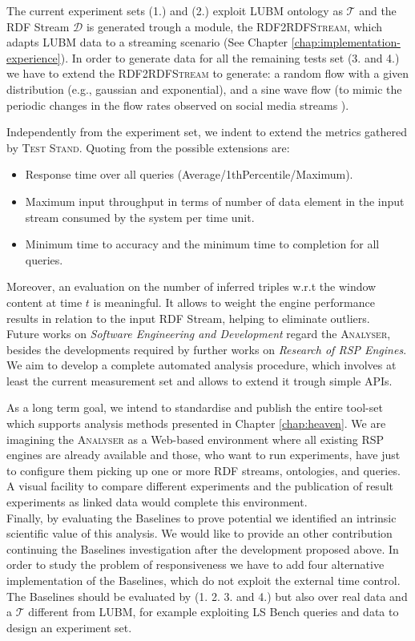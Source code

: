 The current experiment sets (1.) and (2.) exploit LUBM ontology as $\mathcal{T}$ and the RDF Stream $\mathcal{D}$ is generated trough a module, the \textsc{RDF2RDFStream}, which adapts LUBM data to a streaming scenario (See Chapter \ref{chap:implementation-experience}). In order to generate data for all the remaining tests set (3. and 4.) we have to extend the \textsc{RDF2RDFStream} to generate: a random flow with a given distribution (e.g., gaussian and exponential), and a sine wave flow (to mimic the periodic changes in the flow rates observed on social media streams \cite{DBLP:conf/semweb/BalduiniVDTPC13}).

Independently from the experiment set, we indent to extend the metrics gathered by \name \textsc{Test Stand}. Quoting from \cite{DBLP:conf/esws/ScharrenbachUMVB13} the possible extensions are:
\begin{itemize}
\item Response time over all queries (Average/1thPercentile/Maximum).
\item Maximum input throughput in terms of number of data element in the input stream consumed by the system per time unit.
\item Minimum time to accuracy and the minimum time to completion for all queries.
\end{itemize}

Moreover, an evaluation on the number of inferred triples w.r.t the window content at time $t$ is meaningful. It allows to weight the engine performance results in relation to the input RDF Stream, helping to eliminate outliers.\\



\noindent Future works on \textit{Software Engineering and Development} regard the \textsc{Analyser}, besides the developments required by   further works on \textit{Research of RSP Engines}.  We aim to develop a complete automated analysis procedure, which involves at least the current measurement set and allows to extend it trough simple APIs. 


As a long term goal, we intend to standardise and publish the entire tool-set which supports analysis methods presented in Chapter \ref{chap:heaven}. We are imagining the \textsc{Analyser} as a Web-based environment where all existing RSP engines are already available and those, who want to run experiments, have just to configure them picking up one or more RDF streams, ontologies, and queries. A visual facility to compare different experiments and the publication of result experiments as linked data would complete this environment. \\


\noindent Finally, by evaluating the Baselines to prove \name potential we identified an intrinsic scientific value of this analysis. We would like to provide an other contribution continuing the Baselines investigation after the development proposed above. In order to study the problem of responsiveness we have to add four alternative implementation of the Baselines, which do not exploit the external time control. The Baselines should be evaluated by (1. 2. 3. and 4.) but also over real data and a $\mathcal{T}$ different from LUBM, for example exploiting LS Bench queries and data to design an experiment set. 
